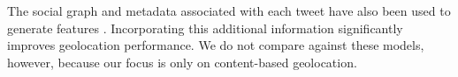\documentclass[sigconf,anonymous,review,10pt]{acmart}
\newcommand{\fixme}[1]{\textcolor{red}{\textbf{FIXME:} {#1}}}
\begin{document}
\begin{description}
%

The social graph and metadata associated with each tweet have also been used to generate features \citep{hecht2011tweets,schulz2013multi,han2014text}.
Incorporating this additional information significantly improves geolocation performance.
We do not compare against these models, however, 
because our focus is only on content-based geolocation.



\end{description}
\end{document}
